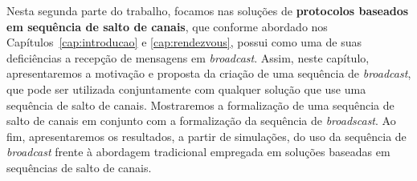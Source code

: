 




Nesta segunda parte do trabalho, focamos nas soluções de {\bf protocolos baseados em sequência de salto de canais}, que conforme abordado nos Capítulos~\ref{cap:introducao} e \ref{cap:rendezvous}, possui como uma de suas deficiências a recepção de mensagens em {\it broadcast}. Assim, neste capítulo, apresentaremos a motivação e proposta da criação de uma sequência de {\it broadcast}, que pode ser utilizada conjuntamente com qualquer solução que use uma sequência de salto de canais. Mostraremos a formalização de uma sequência de salto de canais em conjunto com a formalização da sequência de {\it broadscast}. Ao fim, apresentaremos os resultados, a partir de simulações, do uso da sequência de {\it broadcast} frente à abordagem tradicional empregada em soluções baseadas em sequências de salto de canais. %


